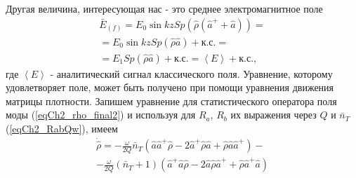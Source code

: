 Другая величина, интересующая нас - это среднее электромагнитное поле
\begin{eqnarray}
\bar{E}_{(f)} = E_0 \sin k z
Sp\left(\hat{\rho}\left(\hat{a}^{+} + \hat{a}\right)\right) = 
\nonumber \\
= E_0 \sin k z Sp\left(\hat{\rho}\hat{a}\right) + \mbox{к.с.} = 
\nonumber \\
= E_1 Sp\left(\hat{\rho}\hat{a}\right) + \mbox{к.с.} =
\left<E\right> + \mbox{к.с.}, 
\nonumber
\end{eqnarray}
где $\left<E\right>$ - аналитический сигнал классического
поля. 
Уравнение, которому удовлетворяет поле, может быть получено при
помощи уравнения движения матрицы плотности. Запишем уравнение для
статистического оператора поля моды  
(\ref{eqCh2_rho_final2}) и
используя для $R_a$, $R_b$ их выражения через $Q$ и $\bar{n}_T$
  (\ref{eqCh2_RabQw}), имеем
\begin{eqnarray}
\dot{\hat{\rho}} =
- \frac{\omega}{2Q}\bar{n}_T
\left(\hat{a}\hat{a}^{+}\hat{\rho} - 
2 \hat{a}^{+}\hat{\rho}\hat{a} + \hat{\rho}\hat{a}\hat{a}^{+}
\right)
- 
\nonumber \\
- \frac{\omega}{2Q}\left(\bar{n}_T + 1\right)
\left(\hat{a}^{+}\hat{a}\hat{\rho} - 
2 \hat{a}\hat{\rho}\hat{a}^{+}
+ \hat{\rho}\hat{a}^{+}\hat{a}
\right)
\label{eqCh2_eq1_add1}
\end{eqnarray}

